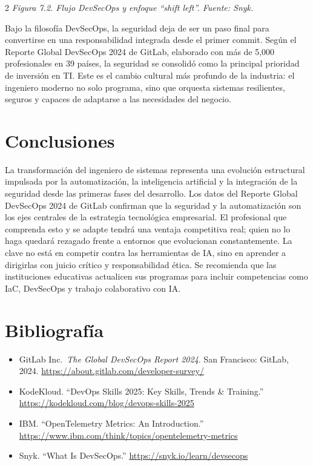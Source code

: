 \documentclass[10pt,spanish,Letterpaper,openany]{book}
\begin{document}
\begin {multicols}{2}
\emph{Figura 7.2. Flujo DevSecOps y enfoque ``shift left''. Fuente: Snyk.}

Bajo la filosofía DevSecOps, la seguridad deja de ser un paso final para convertirse en una responsabilidad integrada desde el primer commit. Según el Reporte Global DevSecOps 2024 de GitLab, elaborado con más de 5,000 profesionales en 39 países, la seguridad se consolidó como la principal prioridad de inversión en TI. Este es el cambio cultural más profundo de la industria: el ingeniero moderno no solo programa, sino que orquesta sistemas resilientes, seguros y capaces de adaptarse a las necesidades del negocio.

\section{Conclusiones}\label{conclusiones-2}

La transformación del ingeniero de sistemas representa una evolución estructural impulsada por la automatización, la inteligencia artificial y la integración de la seguridad desde las primeras fases del desarrollo. Los datos del Reporte Global DevSecOps 2024 de GitLab confirman que la seguridad y la automatización son los ejes centrales de la estrategia tecnológica empresarial. El profesional que comprenda esto y se adapte tendrá una ventaja competitiva real; quien no lo haga quedará rezagado frente a entornos que evolucionan constantemente. La clave no está en competir contra las herramientas de IA, sino en aprender a dirigirlas con juicio crítico y responsabilidad ética. Se recomienda que las instituciones educativas actualicen sus programas para incluir competencias como IaC, DevSecOps y trabajo colaborativo con IA.

\section{Bibliografía}\label{bibliografuxeda-6}

\begin{itemize}
\item
  GitLab Inc.~\emph{The Global DevSecOps Report 2024}. San Francisco: GitLab, 2024. \url{https://about.gitlab.com/developer-survey/}
\item
  KodeKloud. ``DevOps Skills 2025: Key Skills, Trends \& Training.'' \url{https://kodekloud.com/blog/devops-skills-2025}
\item
  IBM. ``OpenTelemetry Metrics: An Introduction.'' \url{https://www.ibm.com/think/topics/opentelemetry-metrics}
\item
  Snyk. ``What Is DevSecOps.'' \url{https://snyk.io/learn/devsecops}
\end{itemize}

\end {multicols}
\end{document}
